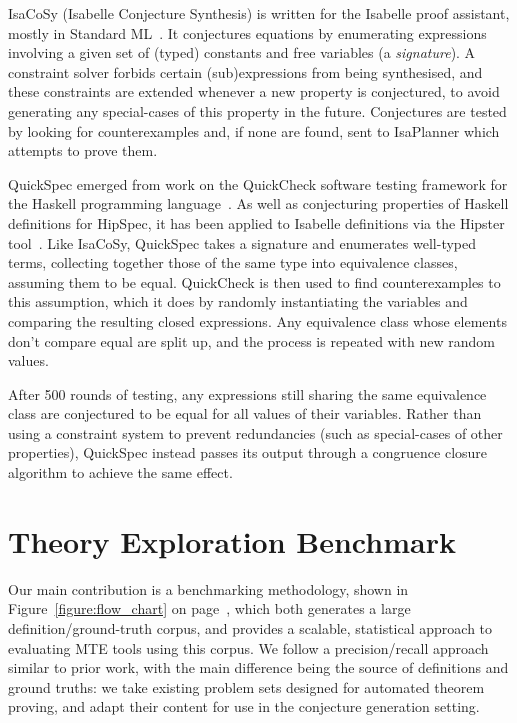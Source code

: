 IsaCoSy (Isabelle Conjecture Synthesis) is written for the Isabelle proof
assistant, mostly in Standard
ML~\cite{Johansson.Dixon.Bundy:conjecture-generation}. It conjectures equations
by enumerating expressions involving a given set of (typed) constants and free
variables (a \emph{signature}). A constraint solver forbids certain
(sub)expressions from being synthesised, and these constraints are extended
whenever a new property is conjectured, to avoid generating any special-cases of
this property in the future. Conjectures are tested by looking for
counterexamples and, if none are found, sent to IsaPlanner which attempts to
prove them.

QuickSpec emerged from work on the QuickCheck software testing framework for the
Haskell programming language~\cite{claessen2011quickcheck}. As well as
conjecturing properties of Haskell definitions for HipSpec, it has been applied
to Isabelle definitions via the Hipster tool~\cite{Hipster}. Like IsaCoSy,
QuickSpec takes a signature and enumerates well-typed terms, collecting together
those of the same type into equivalence classes, assuming them to be
equal. QuickCheck is then used to find counterexamples to this assumption, which
it does by randomly instantiating the variables and comparing the resulting
closed expressions. Any equivalence class whose elements don't compare equal are
split up, and the process is repeated with new random values.

After 500 rounds of testing, any expressions still sharing the same equivalence
class are conjectured to be equal for all values of their variables. Rather than
using a constraint system to prevent redundancies (such as special-cases of
other properties), QuickSpec instead passes its output through a congruence
closure algorithm to achieve the same effect.

\section{Theory Exploration Benchmark}
\label{sec:proposal}

Our main contribution is a benchmarking methodology, shown in
Figure~\ref{figure:flow_chart} on page~\pageref{figure:flow_chart}, which both
generates a large definition/ground-truth corpus, and provides a scalable,
statistical approach to evaluating MTE tools using this corpus. We follow a
precision/recall approach similar to prior work, with the main difference being
the source of definitions and ground truths: we take existing problem sets
designed for automated theorem proving, and adapt their content for use in the
conjecture generation setting.

